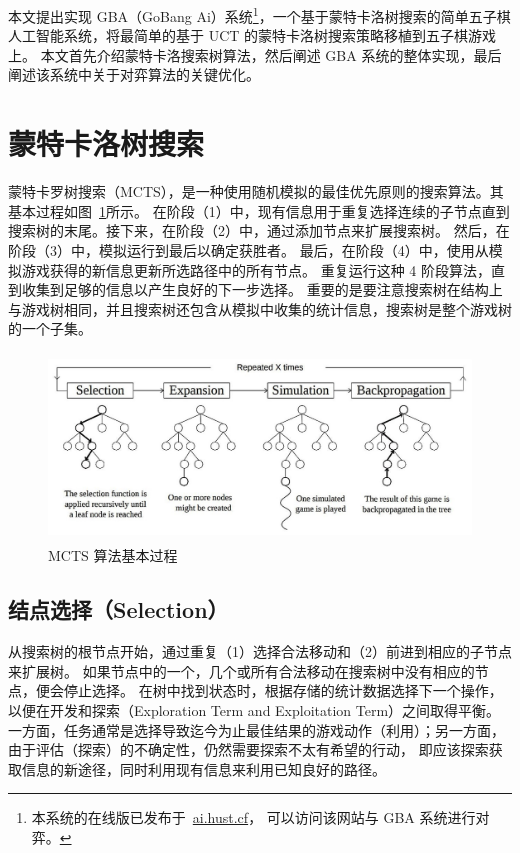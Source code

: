 \documentclass[UTF8,cs4size]{ctexart}
\begin{document}
本文提出实现 GBA（GoBang Ai）系统\footnote{本系统的在线版已发布于~\href{http://ai.hust.cf}{ai.hust.cf}，
可以访问该网站与 GBA 系统进行对弈。}，一个基于蒙特卡洛树搜索的简单五子棋人工智能系统，将最简单的基于 UCT 的蒙特卡洛树搜索策略移植到五子棋游戏上。
本文首先介绍蒙特卡洛搜索树算法，然后阐述 GBA 系统的整体实现，最后阐述该系统中关于对弈算法的关键优化。
\newpage

\section{蒙特卡洛树搜索}
蒙特卡罗树搜索（MCTS），是一种使用随机模拟的最佳优先原则的搜索算法。其基本过程如图~\ref{fig:mcts_phase}所示。
在阶段（1）中，现有信息用于重复选择连续的子节点直到搜索树的末尾。接下来，在阶段（2）中，通过添加节点来扩展搜索树。
然后，在阶段（3）中，模拟运行到最后以确定获胜者。
最后，在阶段（4）中，使用从模拟游戏获得的新信息更新所选路径中的所有节点。
重复运行这种 4 阶段算法，直到收集到足够的信息以产生良好的下一步选择。
重要的是要注意搜索树在结构上与游戏树相同，并且搜索树还包含从模拟中收集的统计信息，搜索树是整个游戏树的一个子集。

\begin{figure}[htb]
  \centering
  \includegraphics[width=\textwidth,height=5cm]{figures/final_mcts_phase.png}
  \caption{MCTS 算法基本过程\cite{DBLP:conf/aiide/ChaslotBSS08}}
  \label{fig:mcts_phase}
\end{figure}

\subsection{结点选择（Selection）}
从搜索树的根节点开始，通过重复（1）选择合法移动和（2）前进到相应的子节点来扩展树。
如果节点中的一个，几个或所有合法移动在搜索树中没有相应的节点，便会停止选择。
在树中找到状态时，根据存储的统计数据选择下一个操作，以便在开发和探索（Exploration Term and Exploitation Term）之间取得平衡。
一方面，任务通常是选择导致迄今为止最佳结果的游戏动作（利用）；另一方面，由于评估（探索）的不确定性，仍然需要探索不太有希望的行动，
即应该探索获取信息的新途径，同时利用现有信息来利用已知良好的路径。
\end{document}
